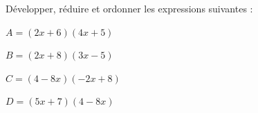 \documentclass[a4paper]{book}
\begin{document}
\newpage


    \begin{exemple}
        Développer, réduire et ordonner les expressions suivantes :

        \medskip

        \begin{minipage}{0.49\linewidth}
            $A=(2x+6)(4x+5)$

            \vspace{4cm}
        \end{minipage}
        \hfill\vline\hfill
        \begin{minipage}{0.49\linewidth}
            $B=(2x+8)(3x-5)$

            \vspace{4cm}
        \end{minipage}

        \bigskip
        
        \begin{minipage}{0.49\linewidth}
            $C=(4-8x)(-2x+8)$

            \vspace{4cm}
        \end{minipage}
        \hfill\vline\hfill
        \begin{minipage}{0.49\linewidth}
            $D=(5x+7)(4-8x)$

            \vspace{4cm}
        \end{minipage}
    \end{exemple}
\end{document}
